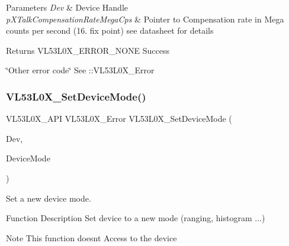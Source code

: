 \begin{DoxyParams}{Parameters}
{\em Dev} & Device Handle \\
\hline
{\em p\+X\+Talk\+Compensation\+Rate\+Mega\+Cps} & Pointer to Compensation rate in Mega counts per second (16. fix point) see datasheet for details \\
\hline
\end{DoxyParams}
\begin{DoxyReturn}{Returns}
V\+L53\+L0\+X\+\_\+\+E\+R\+R\+O\+R\+\_\+\+N\+O\+NE Success 

\char`\"{}\+Other error code\char`\"{} See \+::\+V\+L53\+L0\+X\+\_\+\+Error 
\end{DoxyReturn}
\mbox{\label{group__VL53L0X__parameters__group_ga547bf7479b5ec799db4aafb7111271f7}} 
\subsubsection{\texorpdfstring{V\+L53\+L0\+X\+\_\+\+Set\+Device\+Mode()}{VL53L0X\_SetDeviceMode()}}
{\footnotesize\ttfamily V\+L53\+L0\+X\+\_\+\+A\+PI V\+L53\+L0\+X\+\_\+\+Error V\+L53\+L0\+X\+\_\+\+Set\+Device\+Mode (\begin{DoxyParamCaption}\item[{\hyperlink{group__VL53L0X__platform__group_ga2d6405308b1dd524b462f1b8fb97d167}{V\+L53\+L0\+X\+\_\+\+D\+EV}}]{Dev,  }\item[{V\+L53\+L0\+X\+\_\+\+Device\+Modes}]{Device\+Mode }\end{DoxyParamCaption})}



Set a new device mode. 

\begin{DoxyParagraph}{Function Description}
Set device to a new mode (ranging, histogram ...)
\end{DoxyParagraph}
\begin{DoxyNote}{Note}
This function doesn\textquotesingle{}t Access to the device
\end{DoxyNote}

